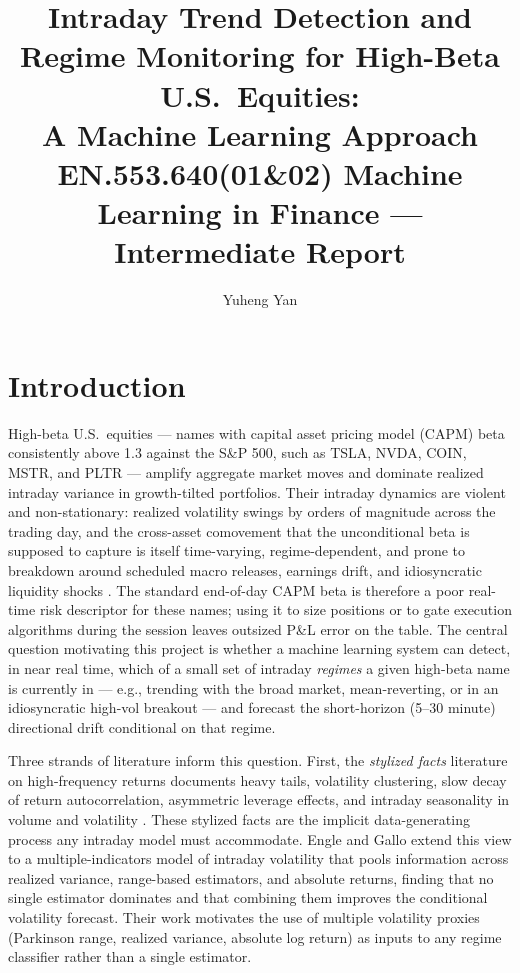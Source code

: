 \documentclass[11pt]{article}
\title{Intraday Trend Detection and Regime Monitoring for High-Beta U.S.\ Equities:\\
A Machine Learning Approach\\
\large EN.553.640(01\&02) Machine Learning in Finance --- Intermediate Report}
\author{Yuheng Yan}
\date{}
\begin{document}
\maketitle

\section{Introduction}

High-beta U.S.\ equities --- names with capital asset pricing model (CAPM) beta consistently above 1.3 against the S\&P 500, such as TSLA, NVDA, COIN, MSTR, and PLTR --- amplify aggregate market moves and dominate realized intraday variance in growth-tilted portfolios.  Their intraday dynamics are violent and non-stationary: realized volatility swings by orders of magnitude across the trading day, and the cross-asset comovement that the unconditional beta is supposed to capture is itself time-varying, regime-dependent, and prone to breakdown around scheduled macro releases, earnings drift, and idiosyncratic liquidity shocks \cite{engle2006, engle2016}.  The standard end-of-day CAPM beta is therefore a poor real-time risk descriptor for these names; using it to size positions or to gate execution algorithms during the session leaves outsized P\&L error on the table.  The central question motivating this project is whether a machine learning system can detect, in near real time, which of a small set of intraday \emph{regimes} a given high-beta name is currently in --- e.g., trending with the broad market, mean-reverting, or in an idiosyncratic high-vol breakout --- and forecast the short-horizon (5--30 minute) directional drift conditional on that regime.

Three strands of literature inform this question.  First, the \emph{stylized facts} literature on high-frequency returns documents heavy tails, volatility clustering, slow decay of return autocorrelation, asymmetric leverage effects, and intraday seasonality in volume and volatility \cite{cont2001}.  These stylized facts are the implicit data-generating process any intraday model must accommodate.  Engle and Gallo \cite{engle2006} extend this view to a multiple-indicators model of intraday volatility that pools information across realized variance, range-based estimators, and absolute returns, finding that no single estimator dominates and that combining them improves the conditional volatility forecast.  Their work motivates the use of multiple volatility proxies (Parkinson range, realized variance, absolute log return) as inputs to any regime classifier rather than a single estimator.
\end{document}

